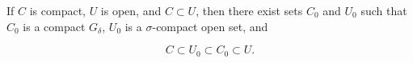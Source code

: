 If $C$ is compact, $U$ is open, and $C \subset U$, then there exist sets $C_0$ and $U_0$ such that $C_0$ is a compact $G_\delta$, $U_0$ is a $\sigma$-compact open set, and

$$C \subset U_0 \subset C_0 \subset U.$$
